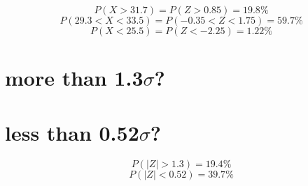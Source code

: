 \documentclass[answers]{exam}
\begin{document}
\begin{questions}
\begin{solution}
	$$P(X>31.7) = P(Z>0.85) = 19.8\%$$
	$$P(29.3<X<33.5) = P(-0.35<Z<1.75) = 59.7\%$$
	$$P(X<25.5) = P(Z<-2.25) = 1.22\%$$
\end{solution}


\begin{parts}
	\part{more than 1.3$\sigma$?}
	\part{less than 0.52$\sigma$?}
\end{parts}

\begin{solution}
	$$P(|Z|>1.3) = 19.4\%$$
	$$P(|Z|<0.52) = 39.7\%$$
\end{solution}

\end{questions}
\end{document}
